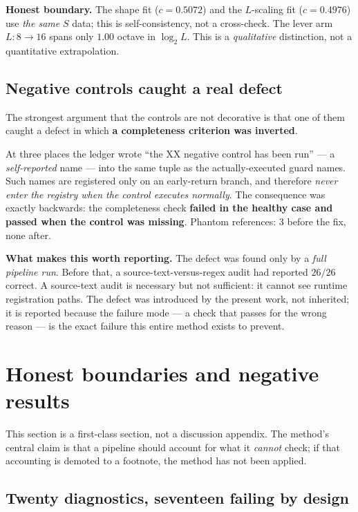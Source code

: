 \documentclass[11pt,a4paper]{article}
\begin{document}
\noindent\textbf{Honest boundary.} The shape fit ($c = 0.5072$) and the $L$-scaling
fit ($c = 0.4976$) use \emph{the same} $S$ data; this is self-consistency, not a
cross-check. The lever arm $L: 8 \to 16$ spans only $1.00$ octave in $\log_2 L$.
This is a \emph{qualitative} distinction, not a quantitative extrapolation.

\subsection{Negative controls caught a real defect}
\label{sec:bug}

The strongest argument that the controls are not decorative is that one of them
caught a defect in which \textbf{a completeness criterion was inverted}.

At three places the ledger wrote ``the XX negative control has been run'' --- a
\emph{self-reported} name --- into the same tuple as the actually-executed guard
names. Such names are registered only on an early-return branch, and therefore
\emph{never enter the registry when the control executes normally}. The consequence
was exactly backwards: the completeness check \textbf{failed in the healthy case and
passed when the control was missing}. Phantom references: 3 before the fix, none
after.

\medskip
\noindent\textbf{What makes this worth reporting.} The defect was found only by a
\emph{full pipeline run}. Before that, a source-text-versus-regex audit had reported
$26/26$ correct. A source-text audit is necessary but not sufficient: it cannot see
runtime registration paths. The defect was introduced by the present work, not
inherited; it is reported because the failure mode --- a check that passes for the
wrong reason --- is the exact failure this entire method exists to prevent.

\section{Honest boundaries and negative results}
\label{sec:boundaries}

This section is a first-class section, not a discussion appendix. The method's
central claim is that a pipeline should account for what it \emph{cannot} check; if
that accounting is demoted to a footnote, the method has not been applied.

\subsection{Twenty diagnostics, seventeen failing by design}
\label{sec:diagnostics}
\end{document}
